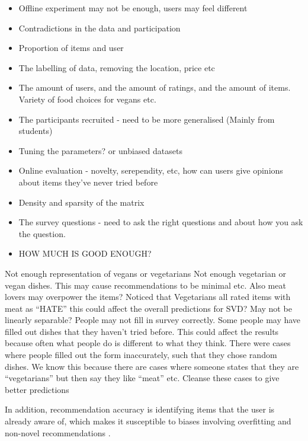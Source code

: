 \begin{itemize}
	\item{Offline experiment may not be enough, users may feel different}
	\item{Contradictions in the data and participation}
	\item{Proportion of items and user}
	\item{The labelling of data, removing the location, price etc}
	\item{The amount of users, and the amount of ratings, and the amount of items. Variety of food choices for vegans etc. }
	\item{The participants recruited - need to be more generalised (Mainly from students)}
	\item{Tuning the parameters? or unbiased datasets}
	\item{Online evaluation - novelty, serependity, etc, how can users give opinions about items they've never tried before}
	\item{Density and sparsity of the matrix}
	\item{The survey questions - need to ask the right questions and about how you ask the question.}
	\item{HOW MUCH IS GOOD ENOUGH?}
\end{itemize}
Not enough representation of vegans or vegetarians
Not enough vegetarian or vegan dishes. 
This may cause recommendations to be minimal etc.
Also meat lovers may overpower the items?
Noticed that Vegetarians all rated items with meat as “HATE” this could affect the overall predictions for SVD?
May not be linearly separable?
People may not fill in survey correctly.
Some people may have filled out dishes that they haven't tried before. This could affect the results because often what people do is different to what they think. 
There were cases where people filled out the form inaccurately, such that they chose random dishes. We know this because there are cases where someone states that they are “vegetarians” but then say they like “meat” etc.
Cleanse these cases to give better predictions

In addition, recommendation accuracy is identifying items that the user is already aware of, which makes it susceptible to biases involving overfitting and non-novel recommendations \cite{evaluation}. 

